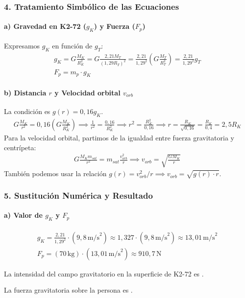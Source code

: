 \subsubsection*{4. Tratamiento Simbólico de las Ecuaciones}
\paragraph*{a) Gravedad en K2-72 ($g_K$) y Fuerza ($F_p$)}
Expresamos $g_K$ en función de $g_T$:
\begin{gather}
    g_K = G \frac{M_K}{R_K^2} = G \frac{2,21 M_T}{(1,29 R_T)^2} = \frac{2,21}{1,29^2} \left( G \frac{M_T}{R_T^2} \right) = \frac{2,21}{1,29^2} g_T \\
    F_p = m_p \cdot g_K
\end{gather}
\paragraph*{b) Distancia $r$ y Velocidad orbital $v_{orb}$}
La condición es $g(r) = 0,16 g_K$.
\begin{gather}
    G \frac{M_K}{r^2} = 0,16 \left( G \frac{M_K}{R_K^2} \right) \implies \frac{1}{r^2} = \frac{0,16}{R_K^2} \implies r^2 = \frac{R_K^2}{0,16} \implies r = \frac{R_K}{\sqrt{0,16}} = \frac{R_K}{0,4} = 2,5 R_K
\end{gather}
Para la velocidad orbital, partimos de la igualdad entre fuerza gravitatoria y centrípeta:
\begin{gather}
    G \frac{M_K m_{sat}}{r^2} = m_{sat} \frac{v_{orb}^2}{r} \implies v_{orb} = \sqrt{\frac{G M_K}{r}}
\end{gather}
También podemos usar la relación $g(r) = v_{orb}^2 / r \implies v_{orb} = \sqrt{g(r) \cdot r}$.

\subsubsection*{5. Sustitución Numérica y Resultado}
\paragraph*{a) Valor de $g_K$ y $F_p$}
\begin{gather}
    g_K = \frac{2,21}{1,29^2} \cdot (9,8 \, \text{m/s}^2) \approx 1,327 \cdot (9,8 \, \text{m/s}^2) \approx 13,01 \, \text{m/s}^2 \\
    F_p = (70 \, \text{kg}) \cdot (13,01 \, \text{m/s}^2) \approx 910,7 \, \text{N}
\end{gather}
\begin{cajaresultado}
    La intensidad del campo gravitatorio en la superficie de K2-72 es .
\end{cajaresultado}
\begin{cajaresultado}
    La fuerza gravitatoria sobre la persona es .
\end{cajaresultado}
